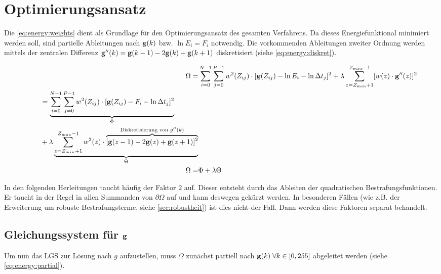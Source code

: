 \section{Optimierungsansatz}
\label{sec:ansatz}
Die \autoref{eq:energy:weights} dient als Grundlage für den Optimierungsansatz des gesamten Verfahrens. Da dieses Energiefunktional minimiert werden soll, sind partielle Ableitungen nach $\mathbf g(k)$ bzw. $\ln E_i = F_i$ notwendig. Die vorkommenden Ableitungen zweiter Ordnung werden mittels der zentralen Differenz $\mathbf g''(k) = \mathbf g(k-1) - 2\mathbf g(k) +\mathbf g(k+1)$ diskretisiert (siehe \autoref{eq:energy:diskret}).

\begin{align}
\Omega =& \sum \limits_{i=0}^{N-1} \sum \limits_{j=0}^{P-1}w^2(Z_{ij})\cdot[\mathbf g(Z_{ij}) - \ln E_i - \ln \Delta t_j]^2 + \lambda  \sum \limits_{z=Z_{min}+1}^{Z_{max}-1} [w(z) \cdot \mathbf g''(z)]^2\\
\label{eq:energy:diskret}
\begin{split}
 &\qquad= \underbrace{\sum \limits_{i=0}^{N-1} \sum \limits_{j=0}^{P-1}w^2(Z_{ij})\cdot[\mathbf g(Z_{ij}) - F_i - \ln \Delta t_j]^2}_{\Phi} \\
 &\qquad+ \lambda \underbrace{ \sum \limits_{z=Z_{min}+1}^{Z_{max}-1} w^2(z) \cdot \overbrace{
 	[\mathbf g(z-1)-2\mathbf g(z)+\mathbf g(z+1)]^2
 }^{
 	\text{Diskretisierung von }g''(k)
 }
 }_{\Theta}
 \end{split}\\
 \Omega =& \Phi + \lambda \Theta
\end{align}

In den folgenden Herleitungen taucht häufig der Faktor $2$ auf. Dieser entsteht durch das Ableiten der quadratischen Bestrafungsfunktionen. Er taucht in der Regel in allen Summanden von $\partial \Omega$ auf und kann deswegen gekürzt werden. In besonderen Fällen (wie z.B. der Erweiterung um robuste Bestrafungsterme, siehe \autoref{sec:robustheit}) ist dies nicht der Fall. Dann werden diese Faktoren separat behandelt.

\subsection{Gleichungssystem für $\mathbf g$}
Um nun das \gls{LGS} zur Lösung nach $g$ aufzustellen, muss $\Omega$ zunächst partiell nach $\mathbf g(k) \; \forall k \in [0,255]$ abgeleitet werden (siehe \autoref{eq:energy:partial}).

